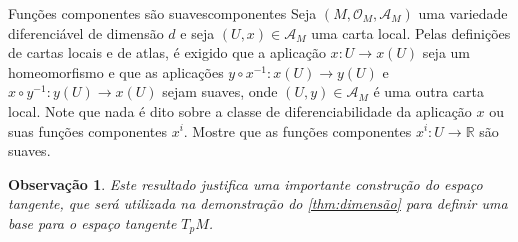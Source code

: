 \documentclass[12pt,a4paper]{article}
\numberwithin{equation}{section}
\newcommand\manifold[1]{\ensuremath{\left(#1, \mathcal{O}_{#1}, \mathscr{A}_{#1}\right)}}
\newtheorem{remark}{Observação}[section]
\begin{document}
\begin{exercício}{Funções componentes são suaves}{componentes}
    Seja \manifold{M} uma variedade diferenciável de dimensão \(d\) e seja \((U, x) \in \mathscr{A}_M\) uma carta local. Pelas definições de cartas locais e de atlas, é exigido que a aplicação \(x : U \to x(U)\) seja um homeomorfismo e que as aplicações \(y \circ x^{-1} : x(U) \to y(U)\) e \(x \circ y^{-1} : y(U) \to x(U)\) sejam suaves, onde \((U, y) \in \mathscr{A}_M\) é uma outra carta local. Note que nada é dito sobre a classe de diferenciabilidade da aplicação \(x\) ou suas funções componentes \(x^i\). Mostre que as funções componentes \(x^i : U \to \mathbb{R}\) são suaves.
\end{exercício}
\begin{remark}
    Este resultado justifica uma importante construção do espaço tangente, que será utilizada na demonstração do \cref{thm:dimensão} para definir uma base para o espaço tangente \(T_pM\).
\end{remark}
\end{document}
